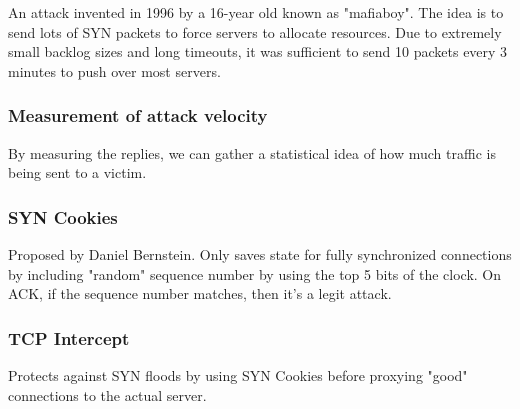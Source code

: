 \documentclass{idc_msc}
\begin{document}
An attack invented in 1996 by a 16-year old known as "mafiaboy".
The idea is to send lots of SYN packets to force servers to allocate resources.
Due to extremely small backlog sizes and long timeouts, it was sufficient to send 10 packets every 3 minutes to push over most servers.

\subsubsection{Measurement of attack velocity}

By measuring the replies, we can gather a statistical idea of how much traffic is being sent to a victim.

\subsubsection{SYN Cookies}

Proposed by Daniel Bernstein.
Only saves state for fully synchronized connections by including "random" sequence number by using the top 5 bits of the clock.
On ACK, if the sequence number matches, then it's a legit attack.

\subsubsection{TCP Intercept}

Protects against SYN floods by using SYN Cookies before proxying "good" connections to the actual server.
\end{document}
